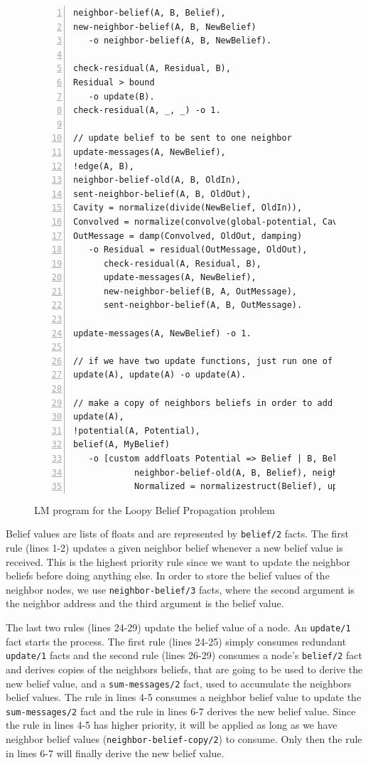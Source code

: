 \begin{figure}[h!]
\small\begin{Verbatim}[numbers=left]
neighbor-belief(A, B, Belief),
new-neighbor-belief(A, B, NewBelief)
   -o neighbor-belief(A, B, NewBelief).

check-residual(A, Residual, B),
Residual > bound
   -o update(B).
check-residual(A, _, _) -o 1.

// update belief to be sent to one neighbor
update-messages(A, NewBelief),
!edge(A, B),
neighbor-belief-old(A, B, OldIn),
sent-neighbor-belief(A, B, OldOut),
Cavity = normalize(divide(NewBelief, OldIn)),
Convolved = normalize(convolve(global-potential, Cavity)),
OutMessage = damp(Convolved, OldOut, damping)
   -o Residual = residual(OutMessage, OldOut),
      check-residual(A, Residual, B),
      update-messages(A, NewBelief),
      new-neighbor-belief(B, A, OutMessage),
      sent-neighbor-belief(A, B, OutMessage).

update-messages(A, NewBelief) -o 1.

// if we have two update functions, just run one of them
update(A), update(A) -o update(A).

// make a copy of neighbors beliefs in order to add them up
update(A),
!potential(A, Potential),
belief(A, MyBelief)
   -o [custom addfloats Potential => Belief | B, Belief, Normalized | neighbor-belief(A, B, Belief) |
            neighbor-belief-old(A, B, Belief), neighbor-belief(A, B, Belief) |
            Normalized = normalizestruct(Belief), update-messages(A, Normalized), belief(A, Normalized)].
\end{Verbatim}
\caption{LM program for the Loopy Belief Propagation problem}
\label{code:coordination:bp}
\end{figure}

Belief values are lists of floats and are represented by \texttt{belief/2}
facts. The first rule (lines 1-2) updates a given neighbor belief whenever a new
belief value is received. This is the highest priority rule since we want to
update the neighbor beliefs before doing anything else. In order to store the
belief values of the neighbor nodes, we use \texttt{neighbor-belief/3} facts,
where the second argument is the neighbor address and the third argument is the
belief value.

The last two rules (lines 24-29) update the belief value of a node. An
\texttt{update/1} fact starts the process. The first rule (lines 24-25) simply
consumes redundant \texttt{update/1} facts and the second rule (lines 26-29)
consumes a node's \texttt{belief/2} fact and derives copies of the neighbors
beliefs, that are going to be used to derive the new belief value, and a
\texttt{sum-messages/2} fact, used to accumulate the neighbors belief values.
The rule in lines 4-5 consumes a neighbor belief value to update the
\texttt{sum-messages/2} fact and the rule in lines 6-7 derives the new belief
value. Since the rule in lines 4-5 has higher priority, it will be applied as
long as we have neighbor belief values (\texttt{neighbor-belief-copy/2}) to
consume. Only then the rule in lines 6-7 will finally derive the new belief
value.

